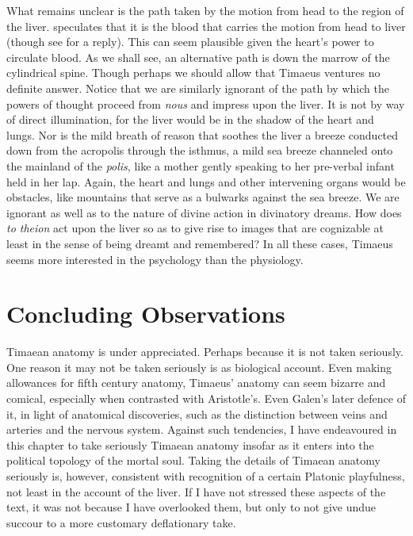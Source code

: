 What remains unclear is the path taken by the motion from head to the region of the liver. \citet{Brisson:1997qr} speculates that it is the blood that carries the motion from head to liver (though see \citealt{Miller:1997up} for a reply). This can seem plausible given the heart's power to circulate blood. As we shall see, an alternative path is down the marrow of the cylindrical spine. Though perhaps we should allow that Timaeus ventures no definite answer. Notice that we are similarly ignorant of the path by which the powers of thought proceed from \emph{nous} and impress upon the liver. It is not by way of direct illumination, for the liver would be in the shadow of the heart and lungs. Nor is the mild breath of reason that soothes the liver a breeze conducted down from the acropolis through the isthmus, a mild sea breeze channeled onto the mainland of the \emph{polis}, like a mother gently speaking to her pre-verbal infant held in her lap. Again, the heart and lungs and other intervening organs would be obstacles, like mountains that serve as a bulwarks against the sea breeze. We are ignorant as well as to the nature of divine action in divinatory dreams. How does \emph{to theion} act upon the liver so as to give rise to images that are cognizable at least in the sense of being dreamt and remembered? In all these cases, Timaeus seems more interested in the psychology than the physiology.


\section{Concluding Observations} %
\label{sec:concluding_observations}

Timaean anatomy is under appreciated. Perhaps because it is not taken seriously. One reason it may not be taken seriously is as biological account. Even making allowances for fifth century anatomy, Timaeus' anatomy can seem bizarre and comical, especially when contrasted with Aristotle's. Even Galen's later defence of it, in light of anatomical discoveries, such as the distinction between veins and arteries and the nervous system. Against such tendencies, I have endeavoured in this chapter to take seriously Timaean anatomy insofar as it enters into the political topology of the mortal soul. Taking the details of Timaean anatomy seriously is, however, consistent with recognition of a certain Platonic playfulness, not least in the account of the liver. If I have not stressed these aspects of the text, it was not because I have overlooked them, but only to not give undue succour to a more customary deflationary take.

